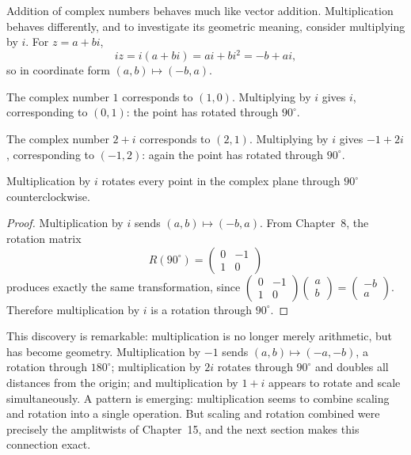 Addition of complex numbers behaves much like vector addition.
Multiplication behaves differently, and to investigate its geometric
meaning, consider multiplying by $i$. For $z=a+bi$,
\[
iz = i(a+bi) = ai + bi^2 = -b+ai,
\]
so in coordinate form $(a,b) \mapsto (-b,a)$.

\begin{example}
The complex number $1$ corresponds to $(1,0)$. Multiplying by $i$ gives
$i$, corresponding to $(0,1)$: the point has rotated through $90^\circ$.
\end{example}

\begin{example}
The complex number $2+i$ corresponds to $(2,1)$. Multiplying by $i$ gives
$-1+2i$, corresponding to $(-1,2)$: again the point has rotated through
$90^\circ$.
\end{example}

\begin{theorem}
Multiplication by $i$ rotates every point in the complex plane through
$90^\circ$ counterclockwise.
\end{theorem}

\begin{proof}
Multiplication by $i$ sends $(a,b) \mapsto (-b,a)$. From Chapter~8, the
rotation matrix
\[
R(90^\circ) = \begin{pmatrix} 0 & -1\\ 1 & 0 \end{pmatrix}
\]
produces exactly the same transformation, since $\begin{pmatrix} 0 &
-1\\ 1 & 0 \end{pmatrix}\begin{pmatrix} a\\ b \end{pmatrix} =
\begin{pmatrix} -b\\ a \end{pmatrix}$. Therefore multiplication by $i$ is
a rotation through $90^\circ$.
\end{proof}

This discovery is remarkable: multiplication is no longer merely
arithmetic, but has become geometry. Multiplication by $-1$ sends
$(a,b)\mapsto(-a,-b)$, a rotation through $180^\circ$; multiplication by
$2i$ rotates through $90^\circ$ and doubles all distances from the
origin; and multiplication by $1+i$ appears to rotate and scale
simultaneously. A pattern is emerging: multiplication seems to combine
scaling and rotation into a single operation. But scaling and rotation
combined were precisely the amplitwists of Chapter~15, and the next
section makes this connection exact.

